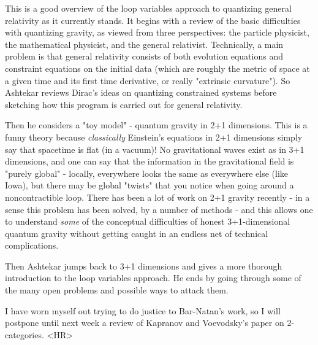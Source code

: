 This is a good overview of the loop variables approach to quantizing
general relativity as it currently stands.   It begins with a review of
the basic difficulties with quantizing gravity, as viewed from three
perspectives: the particle physicist, the mathematical physicist, and
the general relativist.  Technically, a main problem is that general
relativity consists of both evolution equations and constraint equations
on the initial data (which are roughly the metric of space at a given
time and its first time derivative, or really "extrinsic curvature").  
So Ashtekar reviews Dirac's ideas on quantizing constrained systems
before sketching how this program is carried out for general relativity.

Then he considers a "toy model" - quantum gravity in 2+1 dimensions.
This is a funny theory because \emph{classically} Einstein's equations in 2+1
dimensions simply say that spacetime is flat (in a vacuum)!  No
gravitational waves exist as in 3+1 dimensions, and one can say that the
information in the gravitational field is "purely global" - locally,
everywhere looks the same as everywhere else (like Iowa), but there may
be global "twists" that you notice when going around a noncontractible loop.
There has been a lot of work on 2+1 gravity recently - in a sense this problem
has been solved, by a number of methods - and this allows one to
understand \emph{some} of the conceptual difficulties of honest
3+1-dimensional quantum gravity without getting caught in an endless net
of technical complications.  

Then Ashtekar jumps back to 3+1 dimensions and gives a more thorough
introduction to the loop variables approach.  He ends by going through
some of the many open problems and possible ways to attack them.  


I have worn myself out trying to do justice to Bar-Natan's work, so I
will postpone until next week a review of Kapranov and Voevodsky's paper
on 2-categories.  
<HR>




